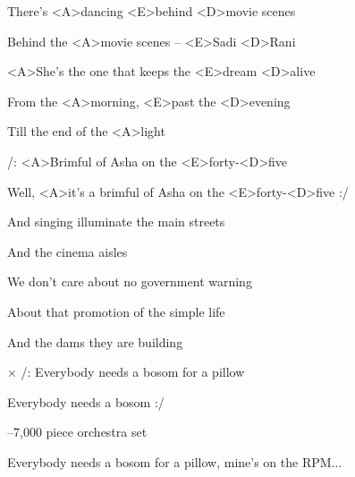 
\zs
There's <A>dancing <E>behind <D>movie scenes

Behind the <A>movie scenes -- <E>Sadi <D>Rani

<A>She's the one that keeps the <E>dream <D>alive

From the <A>morning, <E>past the <D>evening

Till the end of the <A>light
\ks

\zr
/: <A>Brimful of Asha on the <E>forty-<D>five

Well, <A>it's a brimful of Asha on the <E>forty-<D>five :/
\kr

\zs
And singing illuminate the main streets

And the cinema aisles

We don't care about no government warning

About that promotion of the simple life

And the dams they are building
\ks

× /: Everybody needs a bosom for a pillow

Everybody needs a bosom :/
\ks

\zr \kr

\zr \kr

--7,000 piece orchestra set

Everybody needs a bosom for a pillow, mine's on the RPM...
\ks
\kp

